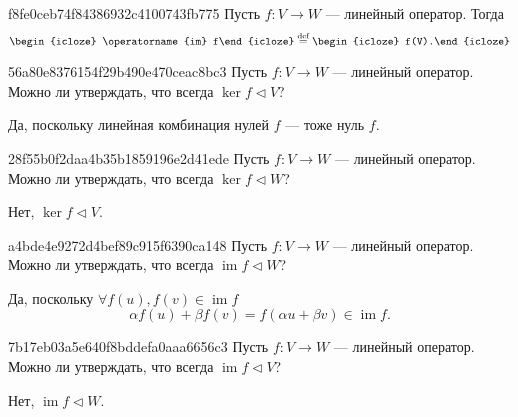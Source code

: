 \begin{note}{f8fe0ceb74f84386932c4100743fb775}
    Пусть \( f : V \to W \) --- линейный оператор. Тогда
    \[
        \begin{icloze}{2}\operatorname{im} f\end{icloze} \overset{\text{def}}= \begin{icloze}{1}f(V).\end{icloze}
    \]
\end{note}

\begin{note}{56a80e8376154f29b490e470ceac8bc3}
    Пусть \( f : V \to W \) --- линейный оператор. Можно ли утверждать, что всегда \( \ker f \triangleleft V \)?

    \begin{cloze}{1}
        Да, поскольку линейная комбинация нулей \( f \) --- тоже нуль \( f \).
    \end{cloze}
\end{note}

\begin{note}{28f55b0f2daa4b35b1859196e2d41ede}
    Пусть \( f : V \to W \) --- линейный оператор. Можно ли утверждать, что всегда \( \ker f \triangleleft W \)?

    \begin{cloze}{1}
        Нет, \( \ker f \triangleleft V \).
    \end{cloze}
\end{note}

\begin{note}{a4bde4e9272d4bef89c915f6390ca148}
    Пусть \( f : V \to W \) --- линейный оператор. Можно ли утверждать, что всегда \( \operatorname{im} f \triangleleft W \)?

    \begin{cloze}{1}
        Да, поскольку \( \forall f(u), f(v) \in \operatorname{im} f \)
        \[
            \alpha f(u) + \beta f(v) = f(\alpha u + \beta v) \in \operatorname{im} f.
        \]
    \end{cloze}
\end{note}

\begin{note}{7b17eb03a5e640f8bddefa0aaa6656c3}
    Пусть \( f : V \to W \) --- линейный оператор. Можно ли утверждать, что всегда \( \operatorname{im} f \triangleleft V \)?

    \begin{cloze}{1}
        Нет, \( \operatorname{im} f \triangleleft W \).
    \end{cloze}
\end{note}

